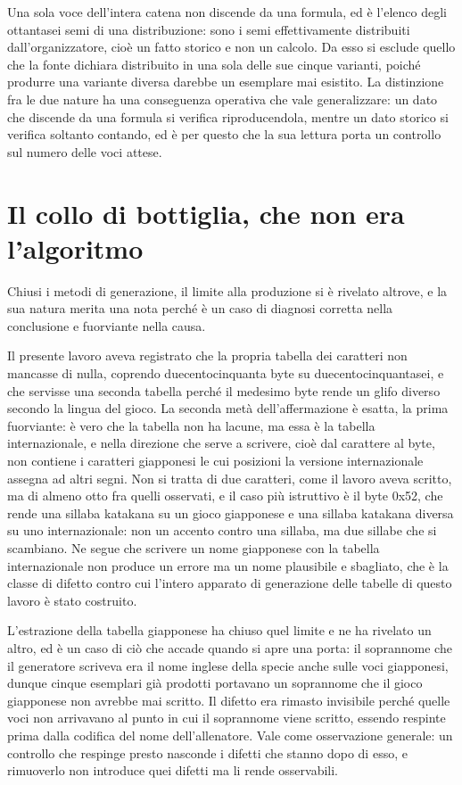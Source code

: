 Una sola voce dell'intera catena non discende da una formula, ed è l'elenco degli ottantasei semi di una distribuzione: sono i semi effettivamente distribuiti dall'organizzatore, cioè un fatto storico e non un calcolo. Da esso si esclude quello che la fonte dichiara distribuito in una sola delle sue cinque varianti, poiché produrre una variante diversa darebbe un esemplare mai esistito. La distinzione fra le due nature ha una conseguenza operativa che vale generalizzare: un dato che discende da una formula si verifica riproducendola, mentre un dato storico si verifica soltanto contando, ed è per questo che la sua lettura porta un controllo sul numero delle voci attese.

\section{Il collo di bottiglia, che non era l'algoritmo}

Chiusi i metodi di generazione, il limite alla produzione si è rivelato altrove, e la sua natura merita una nota perché è un caso di diagnosi corretta nella conclusione e fuorviante nella causa.

Il presente lavoro aveva registrato che la propria tabella dei caratteri non mancasse di nulla, coprendo duecentocinquanta byte su duecentocinquantasei, e che servisse una seconda tabella perché il medesimo byte rende un glifo diverso secondo la lingua del gioco. La seconda metà dell'affermazione è esatta, la prima fuorviante: è vero che la tabella non ha lacune, ma essa è la tabella internazionale, e nella direzione che serve a scrivere, cioè dal carattere al byte, non contiene i caratteri giapponesi le cui posizioni la versione internazionale assegna ad altri segni. Non si tratta di due caratteri, come il lavoro aveva scritto, ma di almeno otto fra quelli osservati, e il caso più istruttivo è il byte 0x52, che rende una sillaba katakana su un gioco giapponese e una sillaba katakana diversa su uno internazionale: non un accento contro una sillaba, ma due sillabe che si scambiano. Ne segue che scrivere un nome giapponese con la tabella internazionale non produce un errore ma un nome plausibile e sbagliato, che è la classe di difetto contro cui l'intero apparato di generazione delle tabelle di questo lavoro è stato costruito.

L'estrazione della tabella giapponese ha chiuso quel limite e ne ha rivelato un altro, ed è un caso di ciò che accade quando si apre una porta: il soprannome che il generatore scriveva era il nome inglese della specie anche sulle voci giapponesi, dunque cinque esemplari già prodotti portavano un soprannome che il gioco giapponese non avrebbe mai scritto. Il difetto era rimasto invisibile perché quelle voci non arrivavano al punto in cui il soprannome viene scritto, essendo respinte prima dalla codifica del nome dell'allenatore. Vale come osservazione generale: un controllo che respinge presto nasconde i difetti che stanno dopo di esso, e rimuoverlo non introduce quei difetti ma li rende osservabili.
